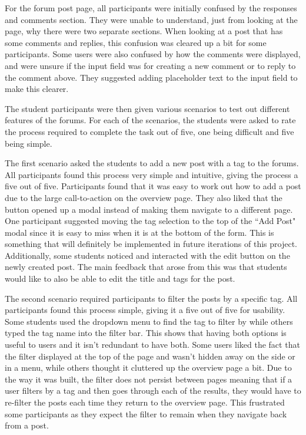 For the forum post page, all participants were initially confused by the responses and comments section.
They were unable to understand, just from looking at the page, why there were two separate sections.
When looking at a post that has some comments and replies, this confusion was cleared up a bit for some participants.
Some users were also confused by how the comments were displayed, and were unsure if the input field was for creating a new comment or to reply to the comment above.
They suggested adding placeholder text to the input field to make this clearer.

The student participants were then given various scenarios to test out different features of the forums.
For each of the scenarios, the students were asked to rate the process required to complete the task out of five, one being difficult and five being simple.

The first scenario asked the students to add a new post with a tag to the forums.
All participants found this process very simple and intuitive, giving the process a five out of five.
Participants found that it was easy to work out how to add a post due to the large call-to-action on the overview page.
They also liked that the button opened up a modal instead of making them navigate to a different page.
One participant suggested moving the tag selection to the top of the ``Add Post" modal since it is easy to miss when it is at the bottom of the form.
This is something that will definitely be implemented in future iterations of this project.
Additionally, some students noticed and interacted with the edit button on the newly created post.
The main feedback that arose from this was that students would like to also be able to edit the title and tags for the post.

The second scenario required participants to filter the posts by a specific tag.
All participants found this process simple, giving it a five out of five for usability.
Some students used the dropdown menu to find the tag to filter by while others typed the tag name into the filter bar.
This shows that having both options is useful to users and it isn't redundant to have both.
Some users liked the fact that the filter displayed at the top of the page and wasn't hidden away on the side or in a menu, while others thought it cluttered up the overview page a bit.
Due to the way it was built, the filter does not persist between pages meaning that if a user filters by a tag and then goes through each of the results, they would have to re-filter the posts each time they return to the overview page.
This frustrated some participants as they expect the filter to remain when they navigate back from a post.

